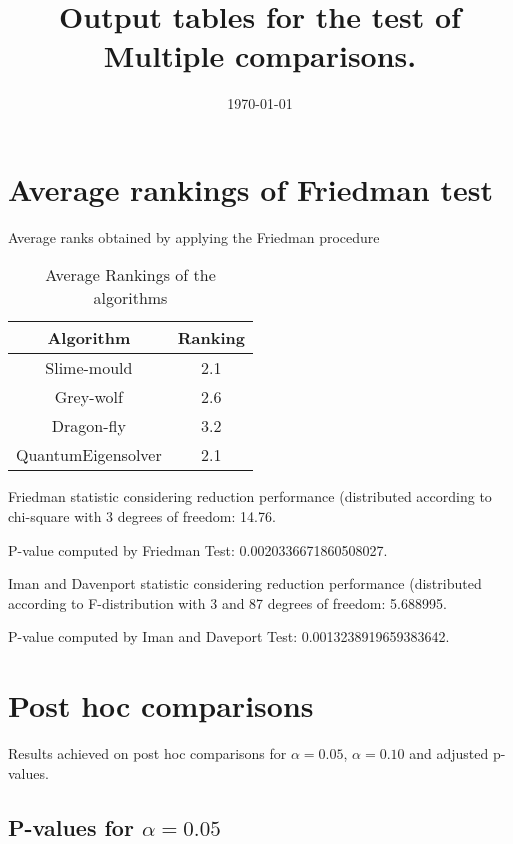 \documentclass[a4paper,10pt]{article}
\title{Output tables for the test of Multiple comparisons.}
\author{}
\date{\today}
\begin{document}
\begin{landscape}
\pagestyle{empty}
\maketitle
\thispagestyle{empty}
\section{Average rankings of Friedman test}



Average ranks obtained by applying the Friedman procedure

\begin{table}[!htp]
\centering
\begin{tabular}{|c|c|}\hline
Algorithm&Ranking\\\hline
Slime-mould & 2.1\\
Grey-wolf & 2.6\\
Dragon-fly & 3.2\\
QuantumEigensolver & 2.1\\
\hline
\end{tabular}
\caption{Average Rankings of the algorithms}
\end{table}

Friedman statistic considering reduction performance (distributed according to chi-square with 3 degrees of freedom: 14.76.

P-value computed by Friedman Test: 0.0020336671860508027.\newline

Iman and Davenport statistic considering reduction performance (distributed according to F-distribution with 3 and 87 degrees of freedom: 5.688995.

P-value computed by Iman and Daveport Test: 0.0013238919659383642.\newline



\pagebreak

\section{Post hoc comparisons}

Results achieved on post hoc comparisons for $\alpha = 0.05$, $\alpha = 0.10$ and adjusted p-values.

\subsection{P-values for $\alpha=0.05$}


\end{landscape}
\end{document}
